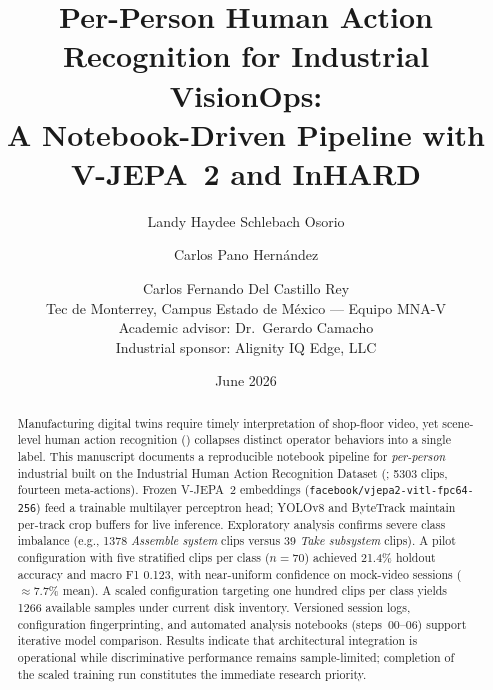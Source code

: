 \documentclass[11pt,letterpaper]{article}
\title{Per-Person Human Action Recognition for Industrial VisionOps:\\
A Notebook-Driven Pipeline with V-JEPA~2 and InHARD}
\author{%
  Landy Haydee Schlebach Osorio \and
  Carlos Pano Hern{\'a}ndez \and
  Carlos Fernando Del Castillo Rey\\[0.6em]
  \small Tec de Monterrey, Campus Estado de M{\'e}xico --- Equipo MNA-V\\[0.3em]
  \small Academic advisor: Dr.~Gerardo Camacho\\
  \small Industrial sponsor: Alignity IQ Edge, LLC
}
\date{June 2026}
\begin{document}
\maketitle

\begin{abstract}
Manufacturing digital twins require timely interpretation of shop-floor video, yet scene-level human action recognition (\har{}) collapses distinct operator behaviors into a single label.
This manuscript documents a reproducible notebook pipeline for \emph{per-person} industrial \har{} built on the Industrial Human Action Recognition Dataset (\inhard{}; \num{5303} clips, fourteen meta-actions).
Frozen V-JEPA~2 embeddings (\texttt{facebook/vjepa2-vitl-fpc64-256}) feed a trainable multilayer perceptron head; YOLOv8 and ByteTrack maintain per-track crop buffers for live inference.
Exploratory analysis confirms severe class imbalance (e.g., \num{1378} \emph{Assemble system} clips versus \num{39} \emph{Take subsystem} clips).
A pilot configuration with five stratified clips per class ($n=\num{70}$) achieved \num{21.4}\% holdout accuracy and macro F1 \num{0.123}, with near-uniform confidence on mock-video sessions ($\approx\num{7.7}\%$ mean).
A scaled configuration targeting one hundred clips per class yields \num{1266} available samples under current disk inventory.
Versioned session logs, configuration fingerprinting, and automated analysis notebooks (steps~00--06) support iterative model comparison.
Results indicate that architectural integration is operational while discriminative performance remains sample-limited; completion of the scaled training run constitutes the immediate research priority.
\end{abstract}










\end{document}
